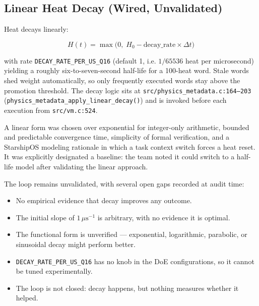\subsection{Linear Heat Decay (Wired, Unvalidated)}

Heat decays linearly:

\begin{equation}
H(t) = \max\!\bigl(0,\; H_0 - \mathrm{decay\_rate} \times \Delta t\bigr)
\end{equation}

with rate \texttt{DECAY\_RATE\_PER\_US\_Q16} (default 1, i.e. $1/65536$ heat per
microsecond) yielding a roughly six-to-seven-second half-life for a 100-heat
word. Stale words shed weight automatically, so only frequently executed words
stay above the promotion threshold. The decay logic sits at
\texttt{src/physics\_metadata.c:164--203}
(\texttt{physics\_metadata\_apply\_linear\_decay()}) and is invoked before each
execution from \texttt{src/vm.c:524}.

A linear form was chosen over exponential for integer-only arithmetic, bounded
and predictable convergence time, simplicity of formal verification, and a
StarshipOS modeling rationale in which a task context switch forces a heat reset.
It was explicitly designated a baseline: the team noted it could switch to a
half-life model after validating the linear approach.

The loop remains unvalidated, with several open gaps recorded at audit time:

\begin{itemize}
  \item No empirical evidence that decay improves any outcome.
  \item The initial slope of $1\,\mu\mathrm{s}^{-1}$ is arbitrary, with no
        evidence it is optimal.
  \item The functional form is unverified --- exponential, logarithmic,
        parabolic, or sinusoidal decay might perform better.
  \item \texttt{DECAY\_RATE\_PER\_US\_Q16} has no knob in the DoE configurations,
        so it cannot be tuned experimentally.
  \item The loop is not closed: decay happens, but nothing measures whether it
        helped.
\end{itemize}


